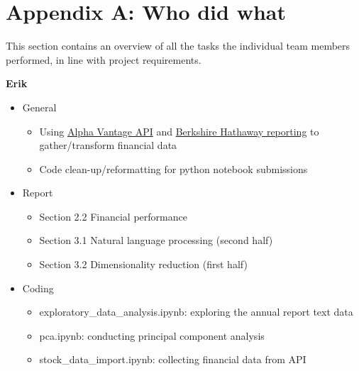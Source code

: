 \documentclass{article}
\begin{document}
\clearpage
\section*{Appendix A: Who did what}
This section contains an overview of all the tasks the individual team members performed, in line with project requirements.

\vspace{5mm}
\textbf{Erik}
\begin{itemize}
    \item General
    \begin{itemize}
        \item Using \href{https://www.alphavantage.co/}{Alpha Vantage API} and \href{https://www.berkshirehathaway.com/letters/2019ltr.pdf}{Berkshire Hathaway reporting} to gather/transform financial data
        \item Code clean-up/reformatting for python notebook submissions
    \end{itemize}
    \item Report
    \begin{itemize}
        \item Section 2.2 Financial performance
        \item Section 3.1 Natural language processing (second half)
        \item Section 3.2 Dimensionality reduction (first half)
    \end{itemize}
    \item Coding
    \begin{itemize}
        \item exploratory\_data\_analysis.ipynb: exploring the annual report text data
        \item pca.ipynb: conducting principal component analysis
        \item stock\_data\_import.ipynb: collecting financial data from API
    \end{itemize}
\end{itemize}
\end{document}
